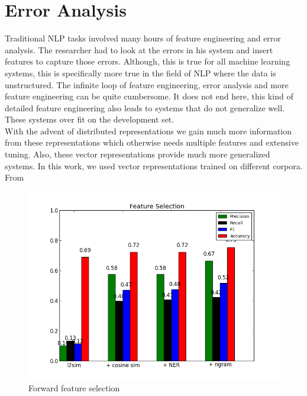 \documentclass[conference]{IEEEtran}
\begin{document}
\section{Error Analysis}
\label{error}
Traditional NLP tasks involved many hours of feature engineering and error analysis. The researcher had to look at the errors in his system and insert features to capture those errors. Although, this is true for all machine learning systems, this is specifically more true in the field of NLP where the data is unstructured. The infinite loop of feature engineering, error analysis and more feature engineering can be quite cumbersome. It does not end here, this kind of detailed feature engineering also leads to systems that do not generalize well. These systems over fit on the development set.\\

\indent With the advent of distributed representations we gain much more information from these representations which otherwise needs multiple features and extensive tuning. Also, these vector representations provide much more generalized systems. In this work, we used vector representations trained on different corpora. From

\begin{figure}
	\centering
	\includegraphics[scale=0.4]{ft_select.png}
	\caption{Forward feature selection}
	\label{feat}
\end{figure}
\end{document}
